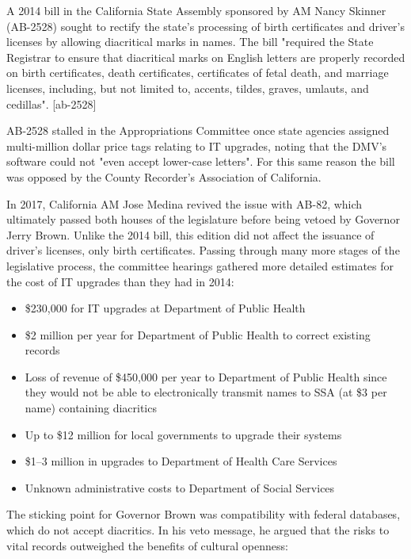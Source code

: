 A 2014 bill in the California State Assembly sponsored by AM Nancy Skinner
(AB-2528) sought to rectify the state's processing of birth certificates and
driver's licenses by allowing diacritical marks in names. The bill "required the
State Registrar to ensure that diacritical marks on English letters are properly
recorded on birth certificates, death certificates, certificates of fetal death,
and marriage licenses, including, but not limited to, accents, tildes, graves,
umlauts, and cedillas". [ab-2528]

AB-2528 stalled in the Appropriations Committee once state agencies assigned
multi-million dollar price tags relating to IT upgrades, noting that the DMV's
software could not "even accept lower-case letters". For this same reason the
bill was opposed by the County Recorder's Association of California.

In 2017, California AM Jose Medina revived the issue with AB-82, which
ultimately passed both houses of the legislature before being vetoed by Governor
Jerry Brown. Unlike the 2014 bill, this edition did not affect the issuance of
driver's licenses, only birth certificates. Passing through many more stages of
the legislative process, the committee hearings gathered more detailed estimates
for the cost of IT upgrades than they had in 2014:

\begin{itemize}

\item \$230,000 for IT upgrades at Department of Public Health
\item \$2 million per year for Department of Public Health to correct existing
records
\item Loss of revenue of \$450,000 per year to Department of Public Health since
they would not be able to electronically transmit names to SSA (at \$3 per name)
containing diacritics
\item Up to \$12 million for local governments to upgrade their systems
\item \$1--3 million in upgrades to Department of Health Care Services
\item Unknown administrative costs to Department of Social Services

\end{itemize}

The sticking point for Governor Brown was compatibility with federal databases,
which do not accept diacritics. In his veto message, he argued that the risks to
vital records outweighed the benefits of cultural openness:

